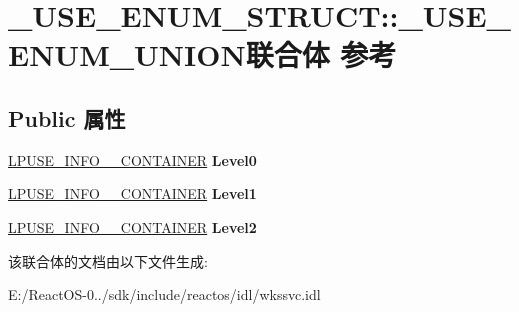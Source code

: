\hypertarget{union___u_s_e___e_n_u_m___s_t_r_u_c_t_1_1___u_s_e___e_n_u_m___u_n_i_o_n}{}\section{\+\_\+\+U\+S\+E\+\_\+\+E\+N\+U\+M\+\_\+\+S\+T\+R\+U\+CT\+:\+:\+\_\+\+U\+S\+E\+\_\+\+E\+N\+U\+M\+\_\+\+U\+N\+I\+O\+N联合体 参考}
\label{union___u_s_e___e_n_u_m___s_t_r_u_c_t_1_1___u_s_e___e_n_u_m___u_n_i_o_n}
\subsection*{Public 属性}
\begin{DoxyCompactItemize}
\item 
\mbox{\label{union___u_s_e___e_n_u_m___s_t_r_u_c_t_1_1___u_s_e___e_n_u_m___u_n_i_o_n_a756aa98eeee917c11b18e01e6ae399cf}} 
\hyperlink{struct___u_s_e___i_n_f_o__0___c_o_n_t_a_i_n_e_r}{L\+P\+U\+S\+E\+\_\+\+I\+N\+F\+O\+\_\+\_\+\+C\+O\+N\+T\+A\+I\+N\+ER} {\bfseries Level0}
\item 
\mbox{\label{union___u_s_e___e_n_u_m___s_t_r_u_c_t_1_1___u_s_e___e_n_u_m___u_n_i_o_n_a02f53e3c0476ba3a864351b59aaaa5ed}} 
\hyperlink{struct___u_s_e___i_n_f_o__1___c_o_n_t_a_i_n_e_r}{L\+P\+U\+S\+E\+\_\+\+I\+N\+F\+O\+\_\+\_\+\+C\+O\+N\+T\+A\+I\+N\+ER} {\bfseries Level1}
\item 
\mbox{\label{union___u_s_e___e_n_u_m___s_t_r_u_c_t_1_1___u_s_e___e_n_u_m___u_n_i_o_n_a4d559cc051eeaa305f632653c4648a0d}} 
\hyperlink{struct___u_s_e___i_n_f_o__2___c_o_n_t_a_i_n_e_r}{L\+P\+U\+S\+E\+\_\+\+I\+N\+F\+O\+\_\+\_\+\+C\+O\+N\+T\+A\+I\+N\+ER} {\bfseries Level2}
\end{DoxyCompactItemize}


该联合体的文档由以下文件生成\+:\begin{DoxyCompactItemize}
\item 
E\+:/\+React\+O\+S-\/0../sdk/include/reactos/idl/wkssvc.\+idl\end{DoxyCompactItemize}
